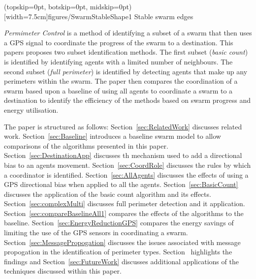 \documentclass{ieeeaccess}
\begin{document}
\Figure[t!](topskip=0pt, botskip=0pt, midskip=0pt)[width=7.5cm]{figures/SwarmStableShape1}
{Stable swarm edges\label{concave:SwarmStableShape1}}

\textit{Permimeter Control} is a method of identifying a subset of a swarm that then uses a GPS signal to coordinate the progress of the swarm to a destination. This papers proposes two subset identification methods. The first subset (\textit{basic count}) is identified by identifying agents with a limited number of neighbours. The second subset (\textit{full perimeter}) is identified by detecting agents that make up any perimeters within the swarm. The paper then compares the coordination of a swarm based upon a baseline of using all agents to coordinate a swarm to a destination to identify the efficiency of the methods based on swarm progress and energy utilisation.

The paper is structured as follows: Section~\ref{sec:RelatedWork} discusses related work. Section~\ref{sec:Baseline} introduces a baseline swarm model to allow comparisons of the algorithms presented in this paper. Section~\ref{sec:DestinationApp} discusses th mechanism used to add a directional bias to an agents movement. Section~\ref{sec:CoordRole} discusses the rules by which a coordinator is identified. Section~\ref{sec:AllAgents} discusses the effects of using a GPS directional bias when applied to all the agents. Section~\ref{sec:BasicCount} discusses the application of the basic count algorithm and its effects. Section~\ref{sec:complexMulti}
discusses full perimeter detection and it application. Section~\ref{sec:compareBaselineAll1} compares the effects of the algorithms to the baseline. Section~\ref{sec:EnergyReductionGPS} compares the energy savings of limiting the use of the GPS sensors in coordinating a swarm. Section~\ref{sec:MessagePropogation} discusses the issues associated with message propogation in the identification of perimeter types. Section~\label{sec:conclusion} highlights the findings and Section~\ref{sec:FutureWork} discusses additional applications of the techniques discussed within this paper.
\end{document}
